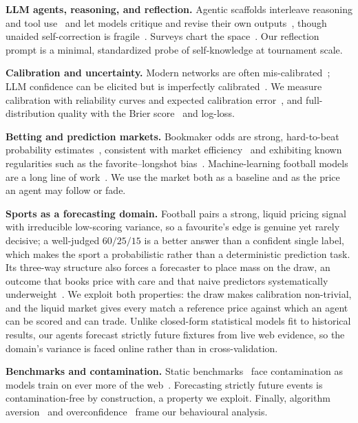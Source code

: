 \documentclass[sigconf,nonacm]{acmart}
\begin{document}
\textbf{LLM agents, reasoning, and reflection.} Agentic scaffolds interleave
reasoning and tool use~\cite{yao2023react,wei2022cot} and let models critique and
revise their own outputs~\cite{shinn2023reflexion,madaan2023selfrefine}, though
unaided self-correction is fragile~\cite{huang2024selfcorrect}. Surveys chart the
space~\cite{xi2023agents,wang2024agentsurvey}. Our reflection prompt is a
minimal, standardized probe of self-knowledge at tournament scale.

\textbf{Calibration and uncertainty.} Modern networks are often
mis-calibrated~\cite{guo2017calibration}; LLM confidence can be elicited but is
imperfectly calibrated~\cite{kadavath2022know,tian2023calibration,xiong2024uncertainty}.
We measure calibration with reliability curves and expected calibration
error~\cite{naeini2015ece}, and full-distribution quality with the Brier
score~\cite{brier1950} and log-loss.

\textbf{Betting and prediction markets.} Bookmaker odds are strong, hard-to-beat
probability estimates~\cite{strumbelj2014odds,wunderlich2018odds,angelini2019efficiency},
consistent with market efficiency~\cite{fama1970efficient} and exhibiting known
regularities such as the favorite--longshot bias~\cite{snowberg2010favorite,levitt2004gambling}.
Machine-learning football models are a long line of
work~\cite{constantinou2012pifootball,baboota2019football}. We use the market
both as a baseline and as the price an agent may follow or fade.

\textbf{Sports as a forecasting domain.} Football pairs a strong, liquid pricing
signal with irreducible low-scoring variance, so a favourite's edge is genuine
yet rarely decisive; a well-judged $60/25/15$ is a better answer than a
confident single label, which makes the sport a probabilistic rather than a
deterministic prediction task. Its three-way structure also forces a forecaster
to place mass on the draw, an outcome that books price with care and that naive
predictors systematically underweight~\cite{constantinou2012pifootball}. We
exploit both properties: the draw makes calibration non-trivial, and the liquid
market gives every match a reference price against which an agent can be scored
and can trade. Unlike closed-form statistical models fit to historical results,
our agents forecast strictly future fixtures from live web evidence, so the
domain's variance is faced online rather than in cross-validation.

\textbf{Benchmarks and contamination.} Static benchmarks~\cite{hendrycks2021mmlu,liang2023helm}
face contamination as models train on ever more of the web~\cite{golchin2024contamination}.
Forecasting strictly future events is contamination-free by construction, a
property we exploit. Finally, algorithm aversion~\cite{dietvorst2015aversion} and
overconfidence~\cite{moore2008overconfidence} frame our behavioural analysis.
\end{document}
